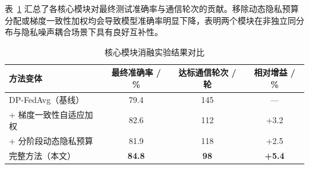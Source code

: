 表~\ref{tab:ablation} 汇总了各核心模块对最终测试准确率与通信轮次的贡献。移除动态隐私预算分配或梯度一致性加权均会导致模型准确率明显下降，表明两个模块在非独立同分布与隐私噪声耦合场景下具有良好互补性\cite{chendengyuan2000}。

\begin{table}[htbp]
  \centering
  \caption{核心模块消融实验结果对比}
  \label{tab:ablation}
  \begin{tabular}{@{}l c c c@{}}
    \toprule
    方法变体 & 最终准确率 / \% & 达标通信轮次 / 轮 & 相对增益 / \% \\
    \midrule
    DP-FedAvg（基线） & 79.4 & 145 & — \\
    + 梯度一致性自适应加权 & 82.6 & 112 & +3.2 \\
    + 分阶段动态隐私预算 & 81.9 & 118 & +2.5 \\
    完整方法（本文） & \textbf{84.8} & \textbf{98} & \textbf{+5.4} \\
    \bottomrule
  \end{tabular}
\end{table}
